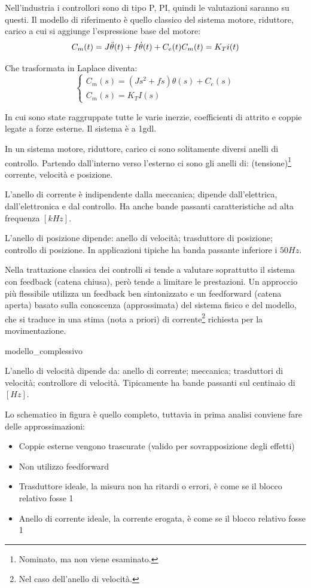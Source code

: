 Nell'industria i controllori sono di tipo P, PI, quindi le valutazioni saranno su questi.
Il modello di riferimento è quello classico del sistema motore, riduttore, carico a cui si aggiunge l'espressione base del motore:
\[
    C_m(t) = J \Ddot{\theta}(t) + f \dot{\theta}(t) + C_e (t) \\
    C_m(t) = K_T i(t)
\]

Che trasformata in Laplace diventa:
\[
\begin{cases}
    C_m(s)=(Js^2+fs)\theta(s) + C_e (s) \\
    C_m(s)=K_T I(s)
\end{cases}
\]

In cui sono state raggruppate tutte le varie inerzie, coefficienti di attrito e coppie legate a forze esterne.
Il sistema è a 1gdl.

In un sistema motore, riduttore, carico ci sono solitamente diversi anelli di controllo. Partendo dall'interno verso l'esterno ci sono gli anelli di: (tensione)\footnote{Nominato, ma non viene esaminato.} corrente, velocità e posizione.

L'anello di corrente è indipendente dalla meccanica; dipende dall'elettrica, dall'elettronica e dal controllo. Ha anche bande passanti caratteristiche ad alta frequenza \([kHz]\).

L'anello di posizione dipende: anello di velocità; trasduttore di posizione; controllo di posizione. In applicazioni tipiche ha banda passante inferiore i \(50 Hz\). 

Nella trattazione classica dei controlli si tende a valutare soprattutto il sistema con feedback (catena chiusa), però tende a limitare le prestazioni. Un approccio più flessibile utilizza un feedback ben sintonizzato e un feedforward (catena aperta) basato sulla conoscenza (approssimata) del sistema fisico e del modello, che si traduce in una stima (nota a priori) di corrente\footnote{Nel caso dell'anello di velocità.} richiesta per la movimentazione.

{modello_complessivo}

L'anello di velocità dipende da: anello di corrente; meccanica; trasduttori di velocità; controllore di velocità.
Tipicamente ha bande passanti sul centinaio di \([Hz]\).

Lo schematico in figura è quello completo, tuttavia in prima analisi conviene fare delle approssimazioni:
\begin{itemize}
    \item Coppie esterne vengono trascurate (valido per sovrapposizione degli effetti)
    \item Non utilizzo feedforward
    \item Trasduttore ideale, la misura non ha ritardi o errori, è come se il blocco relativo fosse 1
    \item Anello di corrente ideale, la corrente erogata, è come se il blocco relativo fosse 1
\end{itemize}

